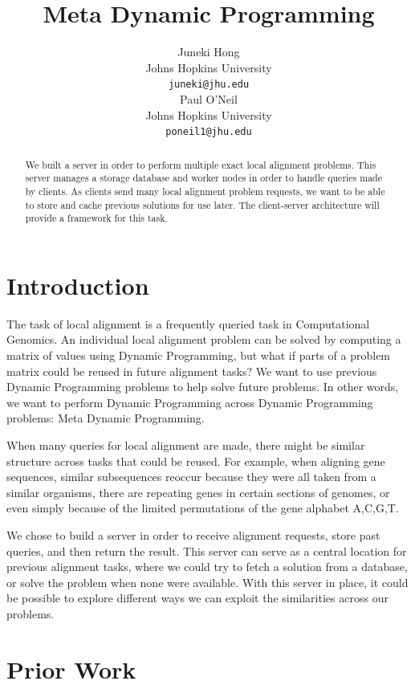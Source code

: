 \documentclass[11pt]{article}
\title{Meta Dynamic Programming}
\author{Juneki Hong \\
  Johns Hopkins University \\
  {\tt juneki@jhu.edu} \\\And
  Paul O'Neil \\
  Johns Hopkins University \\
  {\tt poneil1@jhu.edu} \\}
\date{}
\begin{document}
\begin{abstract}
  We built a server in order to perform multiple exact local alignment problems. This server manages a storage database and worker nodes in order to handle queries made by clients. As clients send many local alignment problem requests, we want to be able to store and cache previous solutions for use later. The client-server architecture will provide a framework for this task. 
\end{abstract}


\section{Introduction}
The task of local alignment is a frequently queried task in Computational Genomics. 
An individual local alignment problem can be solved by computing a matrix of values using Dynamic Programming, but what if parts of a problem matrix could be reused in future alignment tasks? We want to use previous Dynamic Programming problems to help solve future problems. In other words, we want to perform Dynamic Programming across Dynamic Programming problems: Meta Dynamic Programming.

When many queries for local alignment are made, there might be similar structure across tasks that could be reused. For example, when aligning gene sequences, similar subsequences reoccur because they were all taken from a similar organisms, there are repeating genes in certain sections of genomes, or even simply because of the limited permutations of the gene alphabet A,C,G,T.

We chose to build a server in order to receive alignment requests, store past queries, and then return the result. This server can serve as a central location for previous alignment tasks, where we could try to fetch a solution from a database, or solve the problem when none were available. With this server in place, it could be possible to explore different ways we can exploit the similarities across our problems.
 



\section{Prior Work}
\end{document}
